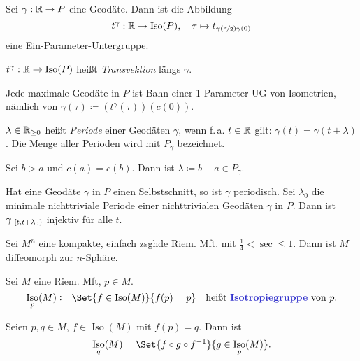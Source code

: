 \documentclass{cheat-sheet}
\DeclareMathOperator{\Iso}{Iso} %
\begin{document}
\begin{lem}
  Sei $\gamma : \mathbb{R} \to P$ eine Geodäte.
  Dann ist die Abbildung
  \[
    t^\gamma : \R \to \Iso(P), \quad
    \tau \mapsto t_{\gamma(\nicefrac{\tau}{2})\gamma(0)}
  \]
  eine Ein-Parameter-Untergruppe.
\end{lem}

\begin{defn}
  $t^\gamma : \R \to \Iso(P)$ heißt \emph{Transvektion} längs $\gamma$.
\end{defn}

\begin{satz}
  Jede maximale Geodäte in $P$ ist Bahn einer 1-Parameter-UG von Isometrien, nämlich von $\gamma(\tau) \coloneqq (t^\gamma(\tau))(c(0))$.
\end{satz}

\begin{defn}
  $\lambda \in \mathbb{R}_{\geq 0}$ heißt \emph{Periode} einer Geodäten $\gamma$, wenn f.\,a. $t \in \mathbb{R}$ gilt: $\gamma(t) = \gamma(t + \lambda)$. Die Menge aller Perioden wird mit $P_\gamma$ bezeichnet.
\end{defn}


\begin{lem}
  Sei $b > a$ und $c(a) = c(b)$. Dann ist $\lambda \coloneqq b - a \in P_\gamma$.
\end{lem}

\begin{kor}
  Hat eine Geodäte $\gamma$ in $P$ einen Selbstschnitt, so ist $\gamma$ periodisch. Sei $\lambda_0$ die minimale nichttriviale Periode einer nichttrivialen Geodäten $\gamma$ in $P$. Dann ist $\gamma|_{\left[ t, t+\lambda_0 \right)}$ injektiv für alle $t$.
\end{kor}


\begin{satz}
  Sei $M^n$ eine kompakte, einfach zsghde Riem. Mft. mit $\tfrac{1}{4} < \sec \leq 1$. Dann ist $M$ diffeomorph zur $n$-Sphäre.
\end{satz}

\begin{defn}
  Sei $M$ eine Riem. Mft, $p \in M$.
  \[
    \Iso_p(M) \coloneqq \Set{ f \in \Iso(M) }{ f(p) = p } \quad
    \text{heißt \emph{Isotropiegruppe} von $p$.}
  \]
\end{defn}

\begin{lem}
  Seien $p, q \in M$, $f \in \Iso(M)$ mit $f(p) = q$. Dann ist
  \[ \Iso_q(M) = \Set{ f \circ g \circ f^{-1} }{ g \in \Iso_p(M) }. \]
\end{lem}
\end{document}
